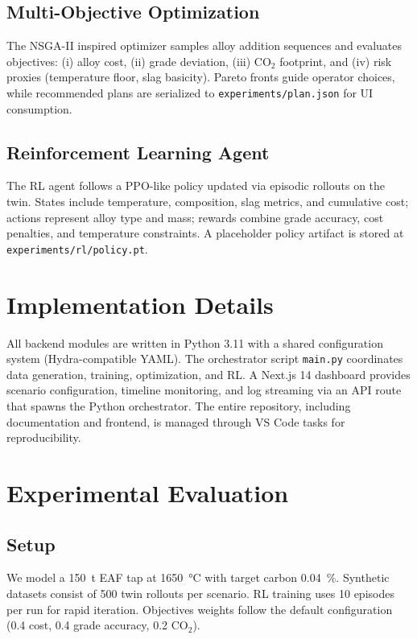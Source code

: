 \documentclass[conference]{IEEEtran}
\begin{document}
\subsection{Multi-Objective Optimization}
The NSGA-II inspired optimizer samples alloy addition sequences and evaluates objectives: (i) alloy cost, (ii) grade deviation, (iii) CO$_2$ footprint, and (iv) risk proxies (temperature floor, slag basicity). Pareto fronts guide operator choices, while recommended plans are serialized to \texttt{experiments/plan.json} for UI consumption.

\subsection{Reinforcement Learning Agent}
The RL agent follows a PPO-like policy updated via episodic rollouts on the twin. States include temperature, composition, slag metrics, and cumulative cost; actions represent alloy type and mass; rewards combine grade accuracy, cost penalties, and temperature constraints. A placeholder policy artifact is stored at \texttt{experiments/rl/policy.pt}.

\section{Implementation Details}
All backend modules are written in Python 3.11 with a shared configuration system (Hydra-compatible YAML). The orchestrator script \texttt{main.py} coordinates data generation, training, optimization, and RL. A Next.js 14 dashboard provides scenario configuration, timeline monitoring, and log streaming via an API route that spawns the Python orchestrator. The entire repository, including documentation and frontend, is managed through VS Code tasks for reproducibility.

\section{Experimental Evaluation}
\subsection{Setup}
We model a \SI{150}{\tonne} EAF tap at \SI{1650}{\celsius} with target carbon \SI{0.04}{\percent}. Synthetic datasets consist of 500 twin rollouts per scenario. RL training uses 10 episodes per run for rapid iteration. Objectives weights follow the default configuration (0.4 cost, 0.4 grade accuracy, 0.2 CO$_2$).
\end{document}
